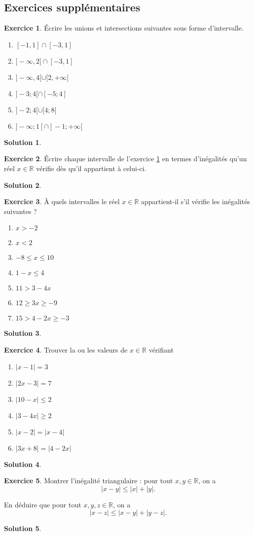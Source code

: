 \documentclass[a4paper, 14pt]{extarticle}
\theoremstyle{plain}
\newtheorem*{sol}{Solution}
\theoremstyle{definition}
\newtheorem{ex}{Exercice}
\newcommand{\R}{\mathbb{R}}
\newcommand{\exe}[2]{
		\begin{ex} #1  \end{ex}
		\begin{sol} #2 \end{sol}
	}
\newcommand{\exe}[2]{
		\begin{ex} #1  \end{ex}
	}
\begin{document}
\newpage
\subsection*{Exercices supplémentaires}

\exe{\label{ex:2}
	Écrire les unions et intersections suivantes sous forme d'intervalle.
	
	
	\begin{multicols}{2}
	\begin{enumerate}
		\item $[-1,1] \cap [-3, 1]$
		\item $]{-}\infty, 2] \cap [-3, 1]$
		\item $]{-}\infty, 4 [ \cup [2, +\infty[$
		\item $] -3 ; 4 [ \cap [-5 ; 4]$
		\item $]-2 ; 4 [  \cup [4 ; 8[$
		\item $ ]{-}\infty ; 1 [ \cap ]-1 ; +\infty [$
	\end{enumerate}
	\end{multicols}
}
{}


\exe{
	Écrire chaque intervalle de l'exercice \ref{ex:2} en termes d'inégalités qu'un réel $x \in \R$ vérifie dès qu'il appartient à celui-ci.
}
{}


\exe{
	À quels intervalles le réel $x \in \R$ appartient-il s'il vérifie les inégalités suivantes ?
	\begin{multicols}{2}
	\begin{enumerate}
		\item $x > -2$
		\item $x  < 2$
		\item $-8 \leq x \leq 10$
		\item $1 - x \leq 4$
		\item $ 11 > 3 - 4x  $
		\item $12 \geq 3x \geq -9$
		\item $15 > 4 - 2x \geq -3$
	\end{enumerate}
	\end{multicols}
}
{}


\exe{
	Trouver la ou les valeurs de $x \in \R$ vérifiant
	\begin{multicols}{2}
	\begin{enumerate}
		\item $|x - 1| = 3$
		\item $|2x-3| = 7$
		\item $|10-x| \leq 2$
		\item $|3 - 4x| \geq 2$
		\item $|x-2| = |x-4|$
		\item $| 3x + 8| = |4 - 2x |$
	\end{enumerate}
	\end{multicols}
}
{}

\exe{
	Montrer l'inégalité triangulaire : pour tout $x,y \in \R$, on a
		\[ |x -  y| \leq |x| + | y|. \]
		
	En déduire que pour tout $x,y,z \in \R$, on a
		\[ |x - z| \leq |x-y| + |y - z|. \]
}
{}
\end{document}
